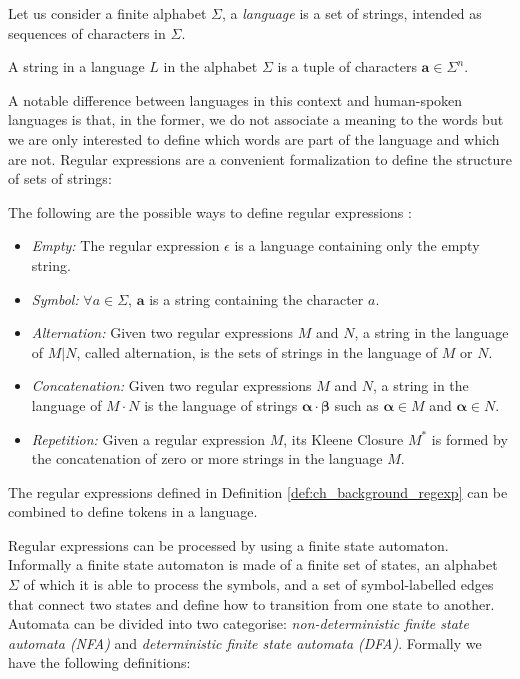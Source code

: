 Let us consider a finite alphabet $\Sigma$, a \textit{language} is a set of strings, intended as sequences of characters in $\Sigma$.

\begin{definition}
	A string in a language $L$ in the alphabet $\Sigma$ is a tuple of characters $\mathbf{a} \in \Sigma^{n}$.
\end{definition}

 A notable difference between  languages in this context and human-spoken languages is that, in the former, we do not associate a meaning to the words but we are only interested to define which words are part of the language and which are not. Regular expressions are a convenient formalization to define the structure of sets of strings:

\begin{definition}
	\label{def:ch_background_regexp}
	 The following are the possible ways to define regular expressions \cite{appel2002javacompiler}:
	\begin{itemize}[noitemsep]
		\item \textit{Empty:} The regular expression $\epsilon$ is a language containing only the empty string.
		\item \textit{Symbol:} $\forall a \in \Sigma$, $\mathbf{a}$ is a string containing the character $a$.
		\item \textit{Alternation:} Given two regular expressions $M$ and $N$, a string in the language of $M | N$, called alternation, is the sets of strings in the language of $M$ or $N$.
		\item \textit{Concatenation:} Given two regular expressions $M$ and $N$, a string in the language of $M \cdot N$ is the language of strings $\mathbf{\alpha \cdot \beta}$ such as $\mathbf{\alpha} \in M$ and $\mathbf{\alpha} \in N$.
		\item \textit{Repetition:} Given a regular expression $M$, its Kleene Closure $M^{*}$ is formed by the concatenation of zero or more strings in the language $M$.
	\end{itemize}
\end{definition}

The regular expressions defined in Definition \ref{def:ch_background_regexp} can be combined to define tokens in a language.

Regular expressions can be processed by using a finite state automaton. Informally a finite state automaton is made of a finite set of states, an alphabet $\Sigma$ of which it is able to process the symbols, and a set of symbol-labelled edges that connect two states and define how to transition from one state to another. Automata can be divided into two categorise: \textit{non-deterministic finite state automata (NFA)} and \textit{deterministic finite state automata (DFA)}. Formally we have the following definitions:

